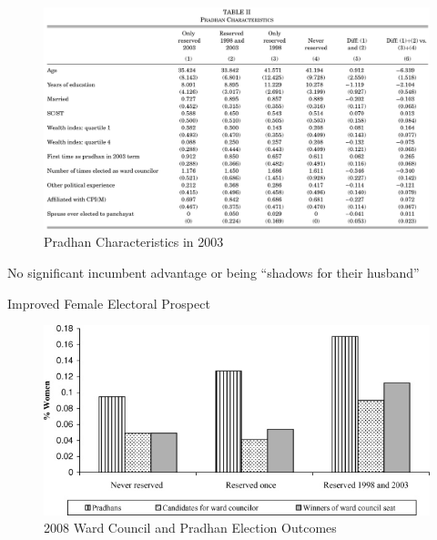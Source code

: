 \documentclass[
  10pt,
  ignorenonframetext,
  aspectratio=43,
]{beamer}
\begin{document}
\begin{frame}{}
\protect\hypertarget{section}{}
\begin{figure}
\centering
\includegraphics{20220523-qje-beaman-duflo-powerful-women.assets/table2-pradhan characteristics.png}
\caption{Pradhan Characteristics in 2003}
\end{figure}

No significant incumbent advantage or being ``shadows for their
husband''
\end{frame}

\begin{frame}{Improved Female Electoral Prospect}
\protect\hypertarget{improved-female-electoral-prospect}{}
\begin{figure}
\centering
\includegraphics{20220523-qje-beaman-duflo-powerful-women.assets/figure2-electoral prospect.png}
\caption{2008 Ward Council and Pradhan Election Outcomes}
\end{figure}
\end{frame}
\end{document}
